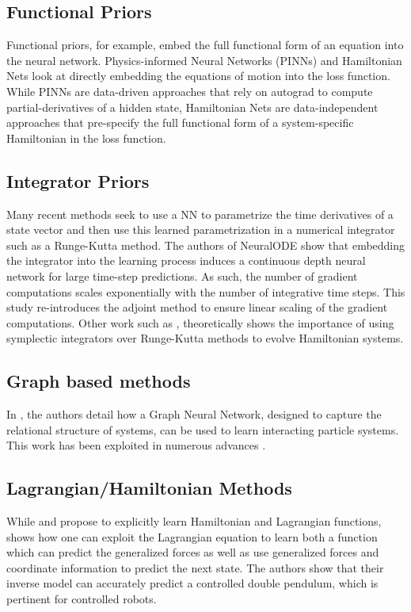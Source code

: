 \documentclass{article}
\begin{document}
\subsection*{Functional Priors}
Functional priors, for example, embed the full functional form of an equation into the neural network. Physics-informed Neural Networks (PINNs) \cite{raissi_physics_2017,raissi_physics-informed_2019} and Hamiltonian Nets \cite{mattheakis_hamiltonian_2020} look at directly embedding the equations of motion into the loss function. While PINNs are data-driven approaches that rely on autograd to compute partial-derivatives of a hidden state, Hamiltonian Nets are data-independent approaches that pre-specify the full functional form of a system-specific Hamiltonian in the loss function.

\subsection*{Integrator Priors}
Many recent methods seek to use a NN to parametrize the time derivatives of a state vector and then use this learned parametrization in a numerical integrator such as a Runge-Kutta method. The authors of NeuralODE \cite{chen_neural_2018} show that embedding the integrator into the learning process induces a continuous depth neural network for large time-step predictions. As such, the number of gradient computations scales exponentially with the number of integrative time steps. This study re-introduces the adjoint method to ensure linear scaling of the gradient computations. Other work such as \cite{zhu_deep_2020}, theoretically shows the importance of using symplectic integrators over Runge-Kutta methods to evolve Hamiltonian systems.

\subsection*{Graph based methods}
In \cite{battaglia_interaction_2016}, the authors detail how a Graph Neural Network, designed to capture the relational structure of systems, can be used to learn interacting particle systems. This work has been exploited in numerous advances \cite{sanchez-gonzalez_graph_2018,sanchez-gonzalez_learning_2020,cranmer_lagrangian_2020}.

\subsection*{Lagrangian/Hamiltonian Methods}
While \cite{cranmer_lagrangian_2020} and \cite{greydanus_hamiltonian_2019} propose to explicitly learn Hamiltonian and Lagrangian functions, \cite{lutter_deep_2019} shows how one can exploit the Lagrangian equation to learn both a function which can predict the generalized forces as well as use generalized forces and coordinate information to predict the next state. The authors show that their inverse model can accurately predict a controlled double pendulum, which is pertinent for controlled robots.
\end{document}
